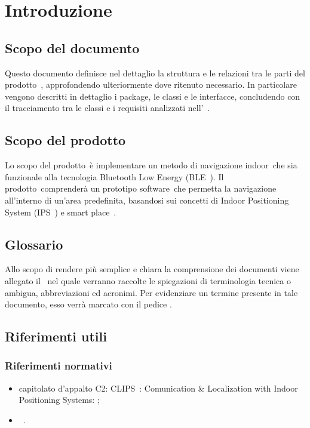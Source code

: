 \documentclass[../DefinizioneDiProdotto.tex]{subfiles}
\begin{document}
\section{Introduzione}
	\subsection{Scopo del documento}
		Questo documento definisce nel dettaglio la struttura e le relazioni tra le parti del prodotto\g\ , approfondendo ulteriormente dove ritenuto necessario. In particolare vengono descritti in dettaglio i package, le classi e le interfacce, concludendo con il tracciamento tra le classi e i requisiti analizzati nell'\analisideirequisitiv\ .
	
	\subsection{Scopo del prodotto}
		Lo scopo del prodotto\g\ è implementare un metodo di navigazione indoor\g\ che sia funzionale alla tecnologia Bluetooth Low Energy (BLE\g\ ). Il prodotto\g\ comprenderà un prototipo software\g\ che permetta la navigazione all'interno di un'area predefinita, basandosi sui concetti di Indoor Positioning System (IPS\g\ ) e smart place\g\ .
	
	\subsection{Glossario} \label{sec:Glossario}
	Allo scopo di rendere più semplice e chiara la comprensione dei documenti viene allegato il \glossariov\ nel quale verranno raccolte le spiegazioni di  terminologia tecnica o  ambigua, abbreviazioni ed acronimi. Per evidenziare un termine presente in tale documento, esso verrà marcato con il pedice \g .
	
	\subsection{Riferimenti utili}
	
		\subsubsection{Riferimenti normativi}
		\begin{itemize}
			\item capitolato d'appalto C2: CLIPS\g\ : Comunication \& Localization with Indoor Positioning Systems:
			;
			\item \normediprogettov\ .
		\end{itemize}
		
\end{document}

